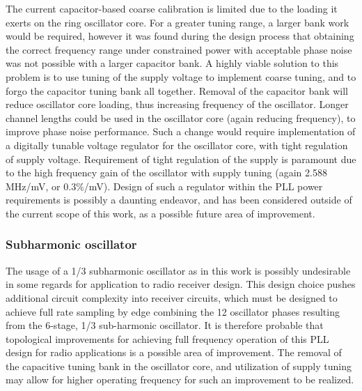	The current capacitor-based coarse calibration is limited due to the loading it exerts on the ring oscillator core. For a greater tuning range, a larger bank work would be required, however it was found during the design process that obtaining the correct frequency range under constrained power with acceptable phase noise was not possible with a larger capacitor bank. A highly viable solution to this problem is to use tuning of the supply voltage to implement coarse tuning, and to forgo the capacitor tuning bank all together. Removal of the capacitor bank will reduce oscillator core loading, thus increasing frequency of the oscillator. Longer channel lengths could be used in the oscillator core (again reducing frequency), to improve phase noise performance. Such a change would require implementation of a digitally tunable voltage regulator for the oscillator core, with tight regulation of supply voltage. Requirement of tight regulation of the supply is paramount due to the high frequency gain of the oscillator with supply tuning (again 2.588 MHz/mV, or 0.3\%/mV). Design of such a regulator within the PLL power requirements is possibly a daunting endeavor, and has been considered outside of the current scope of this work, as a possible future area of improvement.

	\subsubsection{Subharmonic oscillator}
		The usage of a 1/3 subharmonic oscillator as in this work is possibly undesirable in some regards for application to radio receiver design. This design choice pushes additional circuit complexity into receiver circuits, which must be designed to achieve full rate sampling by edge combining the 12 oscillator phases resulting from the 6-stage, 1/3 sub-harmonic oscillator. It is therefore probable that topological improvements for achieving full frequency operation of this PLL design for radio applications is a possible area of improvement. The removal of the capacitive tuning bank in the oscillator core, and utilization of supply tuning may allow for higher operating frequency for such an improvement to be realized.

